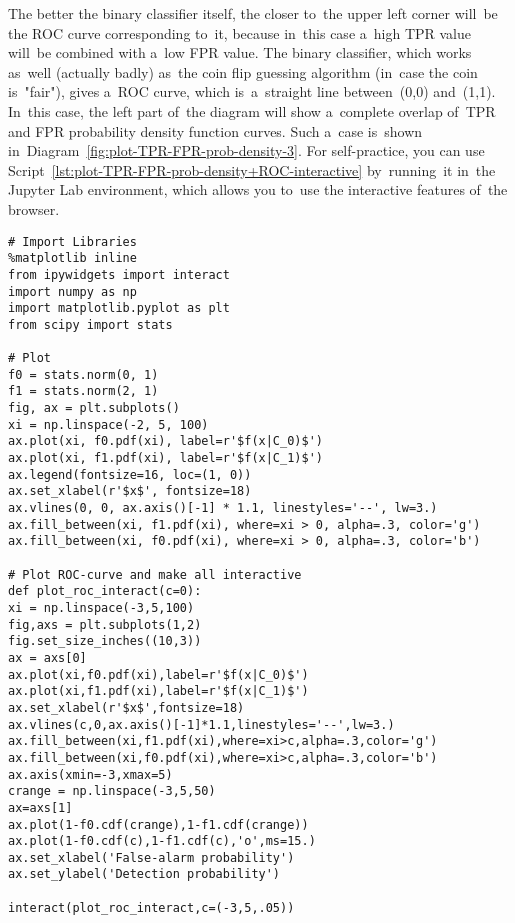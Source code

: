 \documentclass[]{scrreprt}
\begin{document}
The better the binary classifier itself, the closer to~the upper left corner will~be the ROC curve corresponding to~it, because in~this case a~high TPR value will~be combined with a~low FPR value. The binary classifier, which works as~well (actually badly) as~the coin flip guessing algorithm (in~case the coin is~"fair"), gives a~ROC curve, which is~a~straight line between~(0,0) and~(1,1). In~this case, the left part of~the diagram will show a~complete overlap of~TPR and FPR probability density function curves. Such a~case is~shown in~Diagram~\ref{fig:plot-TPR-FPR-prob-density-3}. For self-practice, you can use Script~\ref{lst:plot-TPR-FPR-prob-density+ROC-interactive} by~running~it in~the Jupyter Lab environment, which allows you to~use the interactive features of~the browser.
%
\begin{lstlisting}[float, caption = Build an~interactive graph of~TPR and FPR distribution density and its corresponding ROC curve for a~given threshold value, firstnumber=1, label= lst:plot-TPR-FPR-prob-density+ROC-interactive]
# Import Libraries
%matplotlib inline
from ipywidgets import interact
import numpy as np
import matplotlib.pyplot as plt
from scipy import stats

# Plot
f0 = stats.norm(0, 1)
f1 = stats.norm(2, 1)
fig, ax = plt.subplots()
xi = np.linspace(-2, 5, 100)
ax.plot(xi, f0.pdf(xi), label=r'$f(x|C_0)$')
ax.plot(xi, f1.pdf(xi), label=r'$f(x|C_1)$')
ax.legend(fontsize=16, loc=(1, 0))
ax.set_xlabel(r'$x$', fontsize=18)
ax.vlines(0, 0, ax.axis()[-1] * 1.1, linestyles='--', lw=3.)
ax.fill_between(xi, f1.pdf(xi), where=xi > 0, alpha=.3, color='g')
ax.fill_between(xi, f0.pdf(xi), where=xi > 0, alpha=.3, color='b')

# Plot ROC-curve and make all interactive
def plot_roc_interact(c=0):
xi = np.linspace(-3,5,100)
fig,axs = plt.subplots(1,2)
fig.set_size_inches((10,3))
ax = axs[0]
ax.plot(xi,f0.pdf(xi),label=r'$f(x|C_0)$')
ax.plot(xi,f1.pdf(xi),label=r'$f(x|C_1)$')
ax.set_xlabel(r'$x$',fontsize=18)
ax.vlines(c,0,ax.axis()[-1]*1.1,linestyles='--',lw=3.)
ax.fill_between(xi,f1.pdf(xi),where=xi>c,alpha=.3,color='g')
ax.fill_between(xi,f0.pdf(xi),where=xi>c,alpha=.3,color='b')
ax.axis(xmin=-3,xmax=5)
crange = np.linspace(-3,5,50)
ax=axs[1]
ax.plot(1-f0.cdf(crange),1-f1.cdf(crange))
ax.plot(1-f0.cdf(c),1-f1.cdf(c),'o',ms=15.)
ax.set_xlabel('False-alarm probability')
ax.set_ylabel('Detection probability')

interact(plot_roc_interact,c=(-3,5,.05))

\end{lstlisting}
\end{document}
